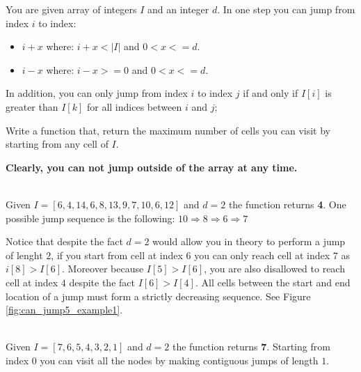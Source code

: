\begin{exercise}
	You are given array of integers $I$  and an integer $d$.
	In one step you can jump from index $i$ to index:
	\begin{itemize}
		\item $i + x$ where: $i + x < |I|$ and $0 < x <= d$.
		\item $i - x$ where: $i - x >= 0$ and $0 < x <= d$.	
	\end{itemize}
	In addition, you can only jump from index $i$ to index $j$ if and only if $I[i]$ is greater than $I[k]$ for all indices between $i$ and $j$;
		
	Write a function that, return the maximum number of cells you can visit by starting from any cell of $I$.
	          
    \textbf{Clearly, you can not jump outside of the array at any time.}
    
    \begin{example}
        \hfill \\
        Given  $I=[6,4,14,6,8,13,9,7,10,6,12]$ and $d=2$ the function returns \textbf{4}.
        One possible jump sequence is the following:
		$10 \Rightarrow 8 \Rightarrow 6 \Rightarrow 7 $
		
		Notice that despite the fact $d=2$ would allow you in theory to perform a jump of lenght $2$, if you start from cell at index $6$ you can only reach cell at index $7$ as $i[8]>I[6]$. Moreover because $I[5] > I[6]$, you are also disallowed to reach cell at index $4$ despite the fact $I[6] > I[4]$. All cells between the start and end location of a jump must form a strictly decreasing sequence. See Figure \ref{fig:can_jump5_example1}.
        \label{ex:can_jump5_example1}
    \end{example}


    \begin{example}
        \hfill \\
        Given  $I=[7,6,5,4,3,2,1]$ and $d=2$ the function returns \textbf{7}.
        Starting from index $0$ you can visit all the nodes by making contiguous jumps of length $1$.
        \label{ex:can_jump5_example2}
    \end{example}
\end{exercise}


